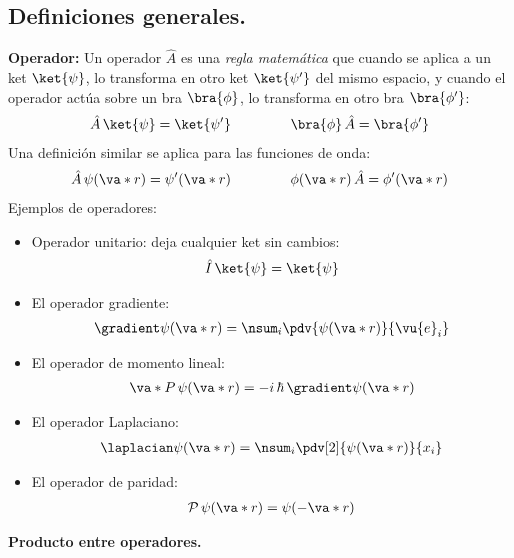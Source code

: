 \subsection{Definiciones generales.}

\textbf{Operador: } Un operador $\hat{A}$ es una \emph{regla matemática} que cuando se aplica a un ket $\ket{\psi}$, lo transforma en otro ket $\ket{\psi^{\prime}}$ del mismo espacio, y cuando el operador actúa sobre un bra $\bra{\phi}$, lo transforma en otro bra $\bra{\phi^{\prime}}$:
\begin{align}
\hat{A} \, \ket{\psi} = \ket{\psi^{\prime}} \hspace{1.5cm} \bra{\phi} \, \hat{A} = \bra{\phi^{\prime}}
\label{eq:ecuacion_02_51}
\end{align}
Una definición similar se aplica para las funciones de onda:
\begin{align}
\hat{A} \, \psi(\va*{r}) =  \psi^{\prime} (\va*{r}) \hspace{1.5cm} \phi(\va*{r}) \, \hat{A} =  \phi^{\prime} (\va*{r})
\label{eq:ecuacion_02_52}
\end{align}
Ejemplos de operadores:
\begin{itemize}
\item Operador unitario: deja cualquier ket sin cambios:
\begin{align*}
\hat{I} \, \ket{\psi} = \ket{\psi}
\end{align*}
\item El operador gradiente:
\begin{align*}
\gradient \psi(\va*{r}) = \nsum_{i} \pdv{\psi(\va*{r})}{\vu{e}_{i}}
\end{align*}
\item El operador de momento lineal:
\begin{align*}
\va*{P} \, \psi(\va*{r}) =  - i \, \hbar \, \gradient \psi(\va*{r})
\end{align*}
\item El operador Laplaciano:
\begin{align*}
\laplacian \psi(\va*{r}) = \nsum_{i} \pdv[2]{\psi(\va*{r})}{x_{i}}
\end{align*}
\item El operador de paridad:
\begin{align*}
\mathcal{P} \, \psi(\va*{r}) = \psi(- \va*{r}) 
\end{align*}
\end{itemize}

\textbf{Producto entre operadores.}

